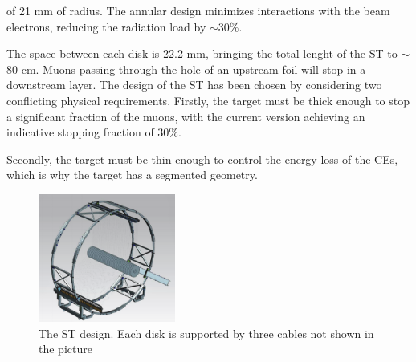 of 21 mm of radius.
The annular design minimizes interactions with the beam electrons, reducing the radiation load by $\sim$30\%.



The space between each disk is
22.2 mm, bringing the total lenght of the ST to $\sim$80 cm.
Muons passing through the hole of an upstream foil will stop in a downstream layer. 
The design of the ST has been chosen by considering two 
conflicting physical requirements. Firstly, the target must be thick enough 
to stop a significant fraction of the muons, with the current version achieving 
an indicative stopping fraction of 30\%.

Secondly, the target must be thin 
enough to control the energy loss of the CEs, which is why 
the target has a segmented geometry.
\begin{figure}[!h]
    \centering
    \includegraphics[width =0.4\textwidth]{figures/png/Screenshot_20240706_122723.png}
    \caption[The Stopping Target design.]{The ST design. 
    Each disk is supported by three cables not shown in the picture }
    \label{fig:ST}
\end{figure}

